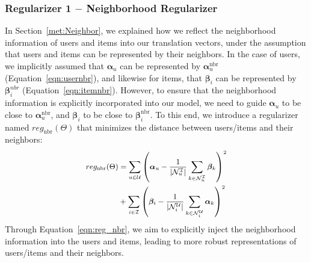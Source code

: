 \documentclass[conference]{IEEEtran}
\begin{document}
\subsubsection{\textbf{Regularizer 1 $-$ Neighborhood Regularizer}}
\label{subsec:reg_nbr}
In Section~\ref{met:Neighbor}, we explained how we reflect the neighborhood information of users and items into our translation vectors, under the assumption that users and items can be represented by their neighbors. In the case of users, we implicitly assumed that $\bm{\alpha}_u$ can be represented by $\bm{\alpha}^{\mathrm{nbr}}_u$ (Equation~\ref{eqn:usernbr}), and likewise for items, that $\bm{\beta}_i$ can be represented by $\bm{\beta}^{nbr}_i$ (Equation~\ref{eqn:itemnbr}).
However, to ensure that the neighborhood information is explicitly incorporated into our model, we need to guide $\bm{\alpha}_u$ to be close to $\bm{\alpha}^{\mathrm{nbr}}_u$, and $\bm{\beta}_i$ to be close to $\bm{\beta}^{\mathrm{nbr}}_i$.
To this end, we introduce a regularizer named $re{g_{\mathrm{nbr}}}(\Theta)$ that minimizes the distance between users/items and their neighbors:
\begin{equation}
	\small
	\label{eqn:reg_nbr}
	\begin{split}
	re{g_{\mathrm{nbr}}}(\Theta ) &= {\sum\limits_{u \in \mathcal{U}} {\left( {{\bm{\alpha} _u} - \frac{1}{{|\mathcal{N}_u^\mathcal{I}|}}\sum\limits_{k \in \mathcal{N}_u^\mathcal{I}} {{\bm{\beta} _k}} } \right)} ^2} \\
	&+ {\sum\limits_{i \in \mathcal{I}} {\left( {{\bm{\beta} _i} - \frac{1}{{|\mathcal{N}_i^\mathcal{U}|}}\sum\limits_{k \in \mathcal{N}_i^\mathcal{U}} {{\bm{\alpha} _k}} } \right)} ^2}
	\end{split}
\end{equation}
Through Equation~\ref{eqn:reg_nbr}, we aim to explicitly inject the neighborhood information into the users and items, leading to more robust representations of users/items and their neighbors.

\medskip
\end{document}
